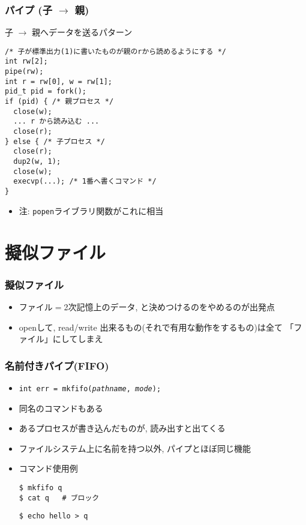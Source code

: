 \documentclass[12pt,dvipdfmx]{beamer}
\begin{document}
\begin{frame}[fragile]
  \frametitle{パイプ (子 $\rightarrow$ 親)}
  子 $\rightarrow$ 親へデータを送るパターン
\begin{lstlisting}
/* 子が標準出力(1)に書いたものが親のrから読めるようにする */
int rw[2];
pipe(rw);
int r = rw[0], w = rw[1];
pid_t pid = fork();
if (pid) { /* 親プロセス */
  close(w);
  ... r から読み込む ...
  close(r);
} else { /* 子プロセス */
  close(r);
  dup2(w, 1);
  close(w);
  execvp(...); /* 1番へ書くコマンド */
}
\end{lstlisting}

\begin{itemize}
\item 注: {\tt popen}ライブラリ関数がこれに相当
\end{itemize}

\end{frame}

\section{擬似ファイル}

\begin{frame}[fragile]
  \frametitle{擬似ファイル}
  \begin{itemize}
  \item ファイル$=$2次記憶上のデータ, と決めつけるのをやめるのが出発点
  \item openして, read/write 出来るもの(それで有用な動作をするもの)は全て
    「ファイル」にしてしまえ
  \end{itemize}
\end{frame}

\begin{frame}[fragile]
  \frametitle{名前付きパイプ(FIFO)}
  \begin{itemize}
  \item {\tt int err = mkfifo({\it pathname}, {\it mode});}
  \item 同名のコマンドもある
  \item あるプロセスが書き込んだものが, 読み出すと出てくる
  \item ファイルシステム上に名前を持つ以外, パイプとほぼ同じ機能
  \item コマンド使用例
\begin{lstlisting}
$ mkfifo q
$ cat q   # ブロック
\end{lstlisting}%
\begin{lstlisting}
$ echo hello > q
\end{lstlisting}%
  \end{itemize}
\end{frame}
\end{document}
